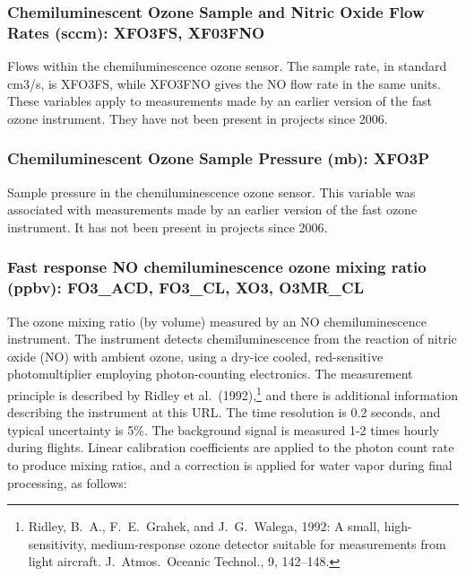 \documentclass[
]{book}
\begin{document}
\hypertarget{xfo3fs}{%
\subsubsection*{Chemiluminescent Ozone Sample and Nitric Oxide Flow Rates (sccm): XFO3FS, XF03FNO}\label{xfo3fs}}

Flows within the chemiluminescence ozone sensor. The sample rate, in standard {cm3/s}, is XFO3FS, while XFO3FNO gives the NO flow rate in the same units. These variables apply to measurements made by an earlier version of the fast ozone instrument. They have not been present in projects since 2006.

\hypertarget{xfo3p}{%
\subsubsection*{Chemiluminescent Ozone Sample Pressure (mb): XFO3P}\label{xfo3p}}

Sample pressure in the chemiluminescence ozone sensor. This variable was associated with
measurements made by an earlier version of the fast ozone instrument. It has not been present in projects since 2006.

\hypertarget{fo3-acd}{%
\subsubsection*{Fast response NO chemiluminescence ozone mixing ratio (ppbv): FO3\_ACD, FO3\_CL, XO3, O3MR\_CL}\label{fo3-acd}}

The ozone mixing ratio (by volume) measured by an NO chemiluminescence instrument. The instrument detects chemiluminescence from the reaction of nitric oxide (NO) with ambient ozone, using a dry-ice cooled, red-sensitive photomultiplier employing photon-counting electronics. The measurement principle is described by Ridley et al.~(1992),\footnote{Ridley, B.~A., F.~E.~Grahek, and J.~G.~Walega, 1992: A small, high-sensitivity, medium-response ozone detector suitable for measurements from light aircraft. J.~Atmos.~Oceanic Technol., 9, 142--148.}
and there is additional information describing the instrument at this URL. The time resolution is 0.2 seconds, and typical uncertainty is 5\%. The background signal is measured 1-2 times hourly during flights. Linear calibration coefficients are applied to the photon count rate to produce mixing ratios, and a correction is applied for water vapor during final processing, as follows:
\end{document}
